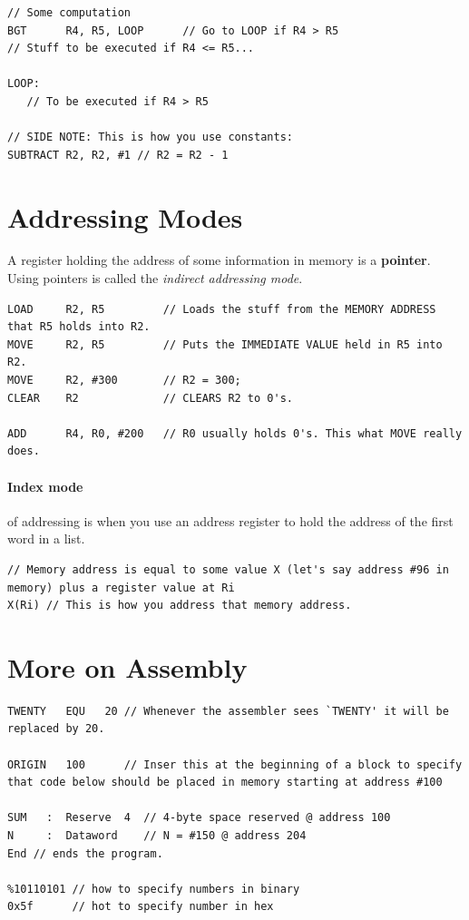 \documentclass[a4paper,12pt]{report}
\begin{document}
\begin{lstlisting}
// Some computation
BGT      R4, R5, LOOP      // Go to LOOP if R4 > R5
// Stuff to be executed if R4 <= R5...

LOOP:
   // To be executed if R4 > R5

// SIDE NOTE: This is how you use constants:
SUBTRACT R2, R2, #1 // R2 = R2 - 1
\end{lstlisting}

\section{Addressing Modes}
A register holding the address of some information in memory is a \textbf{pointer}. Using pointers is called 
the \textit{indirect addressing mode}. 
\begin{lstlisting}
LOAD     R2, R5         // Loads the stuff from the MEMORY ADDRESS that R5 holds into R2.
MOVE     R2, R5         // Puts the IMMEDIATE VALUE held in R5 into R2.
MOVE     R2, #300       // R2 = 300;
CLEAR    R2             // CLEARS R2 to 0's.

ADD      R4, R0, #200   // R0 usually holds 0's. This what MOVE really does.
\end{lstlisting}

\paragraph{Index mode } of addressing is when you use an address register to hold the address of the first word in a list. 
\begin{lstlisting}
// Memory address is equal to some value X (let's say address #96 in memory) plus a register value at Ri 
X(Ri) // This is how you address that memory address.
\end{lstlisting}

\section{More on Assembly}
\begin{lstlisting}
TWENTY   EQU   20 // Whenever the assembler sees `TWENTY' it will be replaced by 20.

ORIGIN   100      // Inser this at the beginning of a block to specify that code below should be placed in memory starting at address #100

SUM   :  Reserve  4  // 4-byte space reserved @ address 100
N     :  Dataword    // N = #150 @ address 204
End // ends the program.

%10110101 // how to specify numbers in binary 
0x5f      // hot to specify number in hex
\end{lstlisting}
\end{document}
